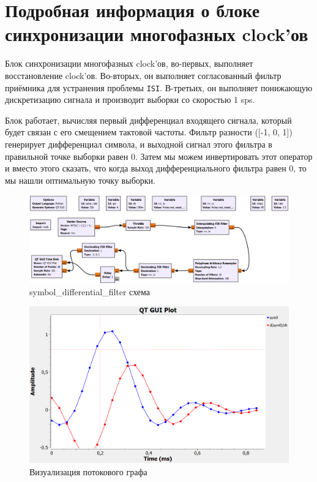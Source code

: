 \documentclass[a4paper,12pt]{report}
\begin{document}
\section{Подробная информация о блоке синхронизации многофазных clock'ов}

Блок синхронизации многофазных clock'ов, во-первых, выполняет восстановление clock'ов. Во-вторых, он выполняет согласованный фильтр приёмника для устранения проблемы \texttt{ISI}. В-третьих, он выполняет понижающую дискретизацию сигнала и производит выборки со скоростью 1 sps.

Блок работает, вычисляя первый дифференциал входящего сигнала, который будет связан с его смещением тактовой частоты. Фильтр разности ([-1, 0, 1]) генерирует дифференциал символа, и выходной сигнал этого фильтра в правильной точке выборки равен 0. Затем мы можем инвертировать этот оператор и вместо этого сказать, что когда выход дифференциального фильтра равен 0, то мы нашли оптимальную точку выборки.

\begin{figure}[H]
        \centering
        \includegraphics[width=1.0\textwidth]{11.png}
        \caption{symbol\_differential\_filter схема}
        \label{fig:lab12_fig3_5}
\end{figure}

\begin{figure}[H]
        \centering
        \includegraphics[width=1.0\textwidth]{12.png}
        \caption{Визуализация потокового графа}
        \label{fig:lab12_fig3_6}
\end{figure}
\end{document}
